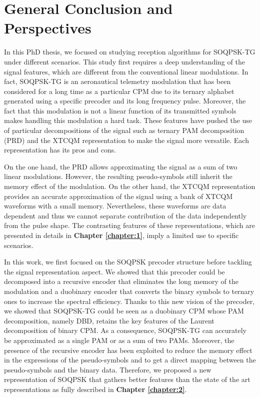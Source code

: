 
\chapter*{General Conclusion and Perspectives}
\label{chapter:CCL}
\graphicspath{{2-Chapters/6-Chapter/Images/}}

In this PhD thesis, we focused on studying reception algorithms for SOQPSK-TG under different scenarios. This study first requires a deep understanding of the signal features, which are different from the conventional linear modulations. In fact, SOQPSK-TG is an aeronautical telemetry modulation that has been considered for a long time as a particular CPM due to its ternary alphabet generated using a specific precoder and its long frequency pulse. Moreover, the fact that this modulation is not a linear function of its transmitted symbols makes handling this modulation a hard task. These features have pushed the use of particular decompositions of the signal such as ternary PAM decomposition (PRD) and the XTCQM representation to make the signal more versatile. Each representation has its pros and cons.

On the one hand, the PRD allows approximating the signal as a sum of two linear modulations. However, the resulting pseudo-symbols still inherit the memory effect of the modulation. On the other hand, the XTCQM representation provides an accurate approximation of the signal using a bank of XTCQM waveforms with a small memory. Nevertheless, these waveforms are data dependent and thus we cannot separate contribution of the data independently from the pulse shape. The contrasting features of these representations, which are presented in details in \textbf{Chapter \ref{chapter:1}}, imply a limited use to specific scenarios.   

In this work, we first focused on the SOQPSK precoder structure before tackling the signal representation aspect. We showed that this precoder could be decomposed into a recursive encoder that eliminates the long memory of the modulation and a duobinary encoder that converts the binary symbols to ternary ones to increase the spectral efficiency. Thanks to this new vision of the precoder, we showed that SOQPSK-TG could be seen as a duobinary CPM whose PAM decomposition, namely DBD, retains the key features of the Laurent decomposition of binary CPM. As a consequence, SOQPSK-TG can accurately be approximated as a single PAM or as a sum of two PAMs. Moreover, the presence of the recursive encoder has been exploited to reduce the memory effect in the expressions of the pseudo-symbols and to get a direct mapping between the pseudo-symbols and the binary data. Therefore, we proposed a new representation of SOQPSK that gathers better features than the state of the art representations as fully described in \textbf{Chapter \ref{chapter:2}}. 

